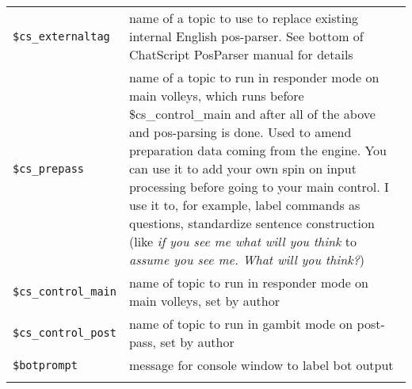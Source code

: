 \documentclass[]{article}
\begin{document}
\begin{longtable}[]{@{}ll@{}}
\begin{minipage}[t]{0.26\columnwidth}\raggedright\strut
\texttt{\$cs\_externaltag}\strut
\end{minipage} & \begin{minipage}[t]{0.10\columnwidth}\raggedright\strut
name of a topic to use to replace existing internal English pos-parser.
See bottom of ChatScript PosParser manual for details\strut
\end{minipage}\tabularnewline
\begin{minipage}[t]{0.26\columnwidth}\raggedright\strut
\texttt{\$cs\_prepass}\strut
\end{minipage} & \begin{minipage}[t]{0.10\columnwidth}\raggedright\strut
name of a topic to run in responder mode on main volleys, which runs
before \$cs\_control\_main and after all of the above and pos-parsing is
done. Used to amend preparation data coming from the engine. You can use
it to add your own spin on input processing before going to your main
control. I use it to, for example, label commands as questions,
standardize sentence construction (like \emph{if you see me what will
you think} to \emph{assume you see me. What will you think?})\strut
\end{minipage}\tabularnewline
\begin{minipage}[t]{0.26\columnwidth}\raggedright\strut
\texttt{\$cs\_control\_main}\strut
\end{minipage} & \begin{minipage}[t]{0.10\columnwidth}\raggedright\strut
name of topic to run in responder mode on main volleys, set by
author\strut
\end{minipage}\tabularnewline
\begin{minipage}[t]{0.26\columnwidth}\raggedright\strut
\texttt{\$cs\_control\_post}\strut
\end{minipage} & \begin{minipage}[t]{0.10\columnwidth}\raggedright\strut
name of topic to run in gambit mode on post-pass, set by author\strut
\end{minipage}\tabularnewline
\begin{minipage}[t]{0.26\columnwidth}\raggedright\strut
\texttt{\$botprompt}\strut
\end{minipage} & \begin{minipage}[t]{0.10\columnwidth}\raggedright\strut
message for console window to label bot output\strut
\end{minipage}\tabularnewline
\begin{minipage}[t]{0.26\columnwidth}\raggedright\strut

\end{minipage}
\end{longtable}
\end{document}
